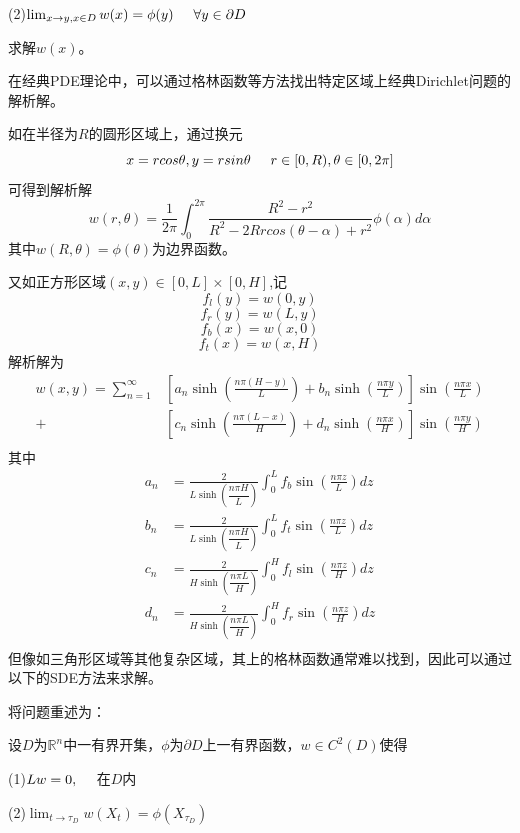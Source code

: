 \documentclass[UTF8，12pt]{ctexart}
\numberwithin{equation}{section}
\begin{document}
\noindent(2)$\lim_{x\to y,x\in D}w(x)=\phi(y)\hspace{0.5cm}\forall y\in\partial D$

\noindent 求解$w(x)$。

在经典PDE理论中，可以通过格林函数等方法找出特定区域上经典Dirichlet问题的解析解。

如在半径为$R$的圆形区域上，通过换元
\[
x=rcos\theta,y=rsin\theta\hspace{0.5cm}r\in[0,R),\theta\in[0,2\pi]
\]
可得到解析解
\[
w(r,\theta)=\frac{1}{2\pi}\int_{0}^{2\pi}\frac{R^2-r^2}{R^2-2Rrcos(\theta-\alpha)+r^2}\phi(\alpha)d\alpha
\]
其中$w(R,\theta)=\phi(\theta)$为边界函数。

又如正方形区域$(x,y)\in[0,L]\times[0,H]$,记
\[
f_l(y)=w(0,y)
\]
\[
f_r(y)=w(L,y)
\]
\[
f_b(x)=w(x,0)
\]
\[
f_t(x)=w(x,H)
\]
解析解为
\begin{equation}
	\begin{split}
		w(x,y) = \sum_{n=1}^{\infty}&\left[a_n \sinh(\frac{n\pi(H-y)}{L})+b_n\sinh(\frac{n\pi y}{L})\right]\sin(\frac{n\pi x}{L})\\
		+&\left[c_n \sinh(\frac{n\pi(L-x)}{H})+d_n\sinh(\frac{n\pi x}{H})\right]\sin(\frac{n\pi y}{H})\\
	\end{split}
\end{equation}
其中
\begin{equation}
	\begin{split}
		a_n&=\frac{2}{L\sinh(\dfrac{n\pi H}{L})}\int_{0}^{L}f_b\sin(\frac{n\pi z}{L})dz\\
		b_n&=\frac{2}{L\sinh(\dfrac{n\pi H}{L})}\int_{0}^{L}f_t\sin(\frac{n\pi z}{L})dz\\
		c_n&=\frac{2}{H\sinh(\dfrac{n\pi L}{H})}\int_{0}^{H}f_l\sin(\frac{n\pi z}{H})dz\\
		d_n&=\frac{2}{H\sinh(\dfrac{n\pi L}{H})}\int_{0}^{H}f_r\sin(\frac{n\pi z}{H})dz\\
	\end{split}
\end{equation}
但像如三角形区域等其他复杂区域，其上的格林函数通常难以找到，因此可以通过以下的SDE方法来求解。

将问题重述为：

设$D$为$\mathbb{R}^n$中一有界开集，$\phi$为$\partial D$上一有界函数，$w\in C^2(D)$使得

\noindent(1)$Lw=0,\hspace{0.5cm}$在$D$内

\noindent(2)$\lim_{t\to\tau_D}w(X_t)=\phi(X_{\tau_D})$
\end{document}

